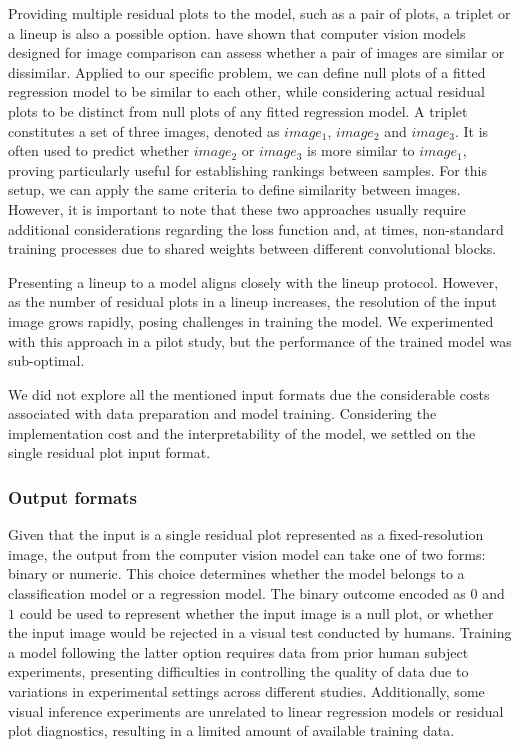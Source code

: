 \documentclass[]{interact}
\theoremstyle{plain}%
\theoremstyle{definition}
\theoremstyle{remark}
\begin{document}
Providing multiple residual plots to the model, such as a pair of plots,
a triplet or a lineup is also a possible option.
\citet{chopra2005learning} have shown that computer vision models
designed for image comparison can assess whether a pair of images are
similar or dissimilar. Applied to our specific problem, we can define
null plots of a fitted regression model to be similar to each other,
while considering actual residual plots to be distinct from null plots
of any fitted regression model. A triplet constitutes a set of three
images, denoted as \(image_1\), \(image_2\) and \(image_3\). It is often
used to predict whether \(image_2\) or \(image_3\) is more similar to
\(image_1\), proving particularly useful for establishing rankings
between samples. For this setup, we can apply the same criteria to
define similarity between images. However, it is important to note that
these two approaches usually require additional considerations regarding
the loss function and, at times, non-standard training processes due to
shared weights between different convolutional blocks.

Presenting a lineup to a model aligns closely with the lineup protocol.
However, as the number of residual plots in a lineup increases, the
resolution of the input image grows rapidly, posing challenges in
training the model. We experimented with this approach in a pilot study,
but the performance of the trained model was sub-optimal.

We did not explore all the mentioned input formats due the considerable
costs associated with data preparation and model training. Considering
the implementation cost and the interpretability of the model, we
settled on the single residual plot input format.

\hypertarget{output-formats}{%
\subsubsection{Output formats}\label{output-formats}}

Given that the input is a single residual plot represented as a
fixed-resolution image, the output from the computer vision model can
take one of two forms: binary or numeric. This choice determines whether
the model belongs to a classification model or a regression model. The
binary outcome encoded as \(0\) and \(1\) could be used to represent
whether the input image is a null plot, or whether the input image would
be rejected in a visual test conducted by humans. Training a model
following the latter option requires data from prior human subject
experiments, presenting difficulties in controlling the quality of data
due to variations in experimental settings across different studies.
Additionally, some visual inference experiments are unrelated to linear
regression models or residual plot diagnostics, resulting in a limited
amount of available training data.
\end{document}

